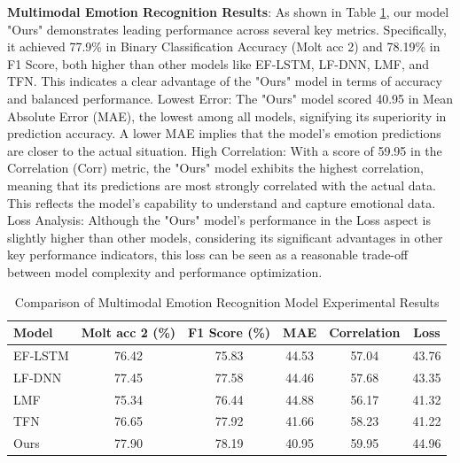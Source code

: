 \documentclass[preprint,12pt]{elsarticle}
\begin{document}
\textbf{Multimodal Emotion Recognition Results}: As shown in Table \ref{Table4}, our model "Ours" demonstrates leading performance across several key metrics. Specifically, it achieved 77.9\% in Binary Classification Accuracy (Molt acc 2) and 78.19\% in F1 Score, both higher than other models like EF-LSTM, LF-DNN, LMF, and TFN. This indicates a clear advantage of the "Ours" model in terms of accuracy and balanced performance. Lowest Error: The "Ours" model scored 40.95 in Mean Absolute Error (MAE), the lowest among all models, signifying its superiority in prediction accuracy. A lower MAE implies that the model's emotion predictions are closer to the actual situation. High Correlation: With a score of 59.95 in the Correlation (Corr) metric, the "Ours" model exhibits the highest correlation, meaning that its predictions are most strongly correlated with the actual data. This reflects the model's capability to understand and capture emotional data. Loss Analysis: Although the "Ours" model's performance in the Loss aspect is slightly higher than other models, considering its significant advantages in other key performance indicators, this loss can be seen as a reasonable trade-off between model complexity and performance optimization.
\begin{table}[ht]
\centering
\caption{Comparison of Multimodal Emotion Recognition Model Experimental Results}\label{Table4}
\begin{tabular}{lccccc}
\hline
Model   & Molt acc 2 (\%) & F1 Score (\%) & MAE & Correlation & Loss \\
\hline
EF-LSTM & 76.42           & 75.83         & 44.53 & 57.04      & 43.76 \\
LF-DNN  & 77.45           & 77.58         & 44.46 & 57.68      & 43.35 \\
LMF     & 75.34           & 76.44         & 44.88 & 56.17      & 41.32 \\
TFN     & 76.65           & 77.92         & 41.66 & 58.23      & 41.22 \\
Ours    & 77.90           & 78.19         & 40.95 & 59.95      & 44.96 \\
\hline
\end{tabular}
\end{table}
\end{document}
